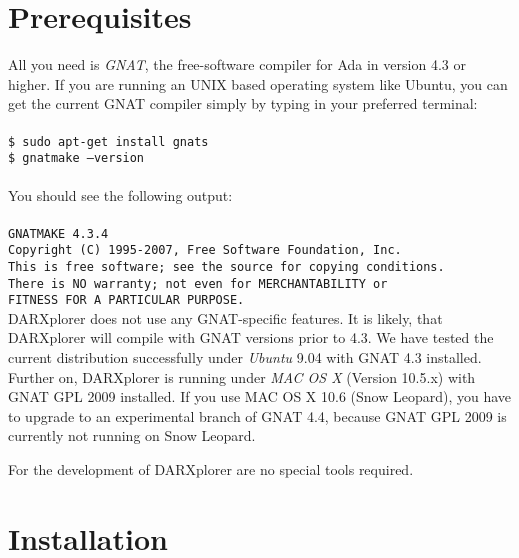 \documentclass{acmtrans2m}
\begin{document}
\section{Prerequisites}\label{chapter:pre}
All you need is \textit{GNAT}, the free-software compiler for Ada in version 4.3 
or higher. If you are running an UNIX based operating system like Ubuntu, you can
get the current GNAT compiler simply by typing in your preferred terminal:\\ \\
\noindent\hspace*{12mm}%
\texttt{\$ sudo apt-get install gnats}\\
\noindent\hspace*{12mm}%
\texttt{\$ gnatmake --version}\\ \\
You should see the following output:\\ \\
\noindent\hspace*{12mm}%
\texttt{GNATMAKE 4.3.4}\\
\noindent\hspace*{12mm}%
\texttt{Copyright (C) 1995-2007, Free Software Foundation, Inc.}\\
\noindent\hspace*{12mm}%
\texttt{This is free software; see the source for copying conditions.}\\
\noindent\hspace*{12mm}%
\texttt{There is NO warranty; not even for MERCHANTABILITY or}\\ 
\noindent\hspace*{12mm}%
\texttt{FITNESS FOR A PARTICULAR PURPOSE.}\\

DARXplorer does not use any GNAT-specific features. It is likely, that
DARXplorer will compile with GNAT versions prior to 4.3. We have tested
the current distribution successfully under \textit{Ubuntu} 9.04 with GNAT 4.3 installed.
Further on, DARXplorer is running under \textit{MAC OS X} (Version 10.5.x)
with GNAT GPL 2009 installed. If you use MAC OS X 10.6 (Snow Leopard),
you have to upgrade to an experimental branch of GNAT 4.4, because GNAT GPL 2009
is currently not running on Snow Leopard.

For the development of DARXplorer are no special tools required.

\section{Installation}\label{chapter:installation}
\end{document}
